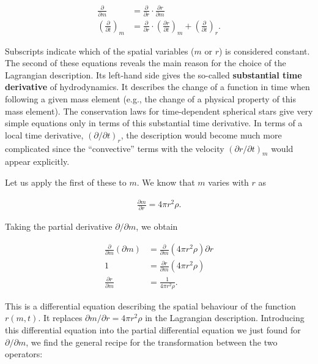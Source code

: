 \documentclass[a4paper,10pt]{article}
\begin{document}
\begin{align*}
    \frac{\partial}{\partial m} &= \frac{\partial}{\partial r} \cdot \frac{\partial r}{\partial m} \\
    \left(\frac{\partial}{\partial t}\right)_m &= \frac{\partial}{\partial r}\cdot \left(\frac{\partial r}{\partial t}\right)_m + \left(\frac{\partial}{\partial t}\right)_r.
\end{align*}

{\noindent}Subscripts indicate which of the spatial variables ($m$ or $r$) is considered constant. The second of these equations reveals the main reason for the choice of the Lagrangian description. Its left-hand side gives the so-called \textbf{substantial time derivative} of hydrodynamics. It describes the change of a function in time when following a given mass element (e.g., the change of a physical property of this mass element). The conservation laws for time-dependent spherical stars give very simple equations only in terms of this substantial time derivative. In terms of a local time derivative, $(\partial/\partial t)_r$, the description would become much more complicated since the ``convective'' terms with the velocity $(\partial r/\partial t)_m$ would appear explicitly.

{\noindent}Let us apply the first of these to $m$. We know that $m$ varies with $r$ as

\begin{align*}
    \frac{\partial m}{\partial r} = 4\pi r^2 \rho.
\end{align*}

{\noindent}Taking the partial derivative $\partial/\partial m$, we obtain

\begin{align*}
    \frac{\partial}{\partial m} \left(\partial m\right) &= \frac{\partial}{\partial m} \left(4\pi r^2 \rho\right) \partial r \\
    1& = \frac{\partial r}{\partial m} \left(4\pi r^2 \rho\right) \\
    \frac{\partial r}{\partial m} &= \frac{1}{4\pi r^2 \rho}.
\end{align*}

{\noindent}This is a differential equation describing the spatial behaviour of the function $r(m,t)$. It replaces $\partial m/\partial r=4\pi r^2\rho$ in the Lagrangian description. Introducing this differential equation into the partial differential equation we just found for $\partial/\partial m$, we find the general recipe for the transformation between the two operators:
\end{document}
